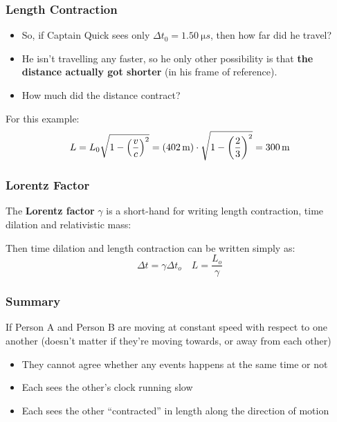 \documentclass[12pt,compress,aspectratio=169]{beamer}
\newcommand{\bigsqrt}{\ensuremath\sqrt{1-\left(\frac{v}{c}\right)^2}}
\newcommand{\lorentz}{\ensuremath\frac{1}{\bigsqrt}}
\begin{document}
\begin{frame}
  \frametitle{Length Contraction}
  \begin{itemize}
  \item So, if Captain Quick sees only $\Delta t_0=\SI{1.50}{\micro s}$, then
    how far did he travel?
  \item He isn't travelling any faster, so he only other possibility is that
    \textbf{the distance actually got shorter} (in his frame of reference).
  \item How much did the distance contract?
  \end{itemize}
  
  \vspace{-.3in}{\LARGE
    \begin{displaymath}
      \boxed{L=L_0\bigsqrt}
    \end{displaymath}
  }

  For this example:
  \begin{displaymath}
    L=L_0\bigsqrt=(\SI{402}{m})\cdot\sqrt{1-\left(\frac{2}{3}\right)^2}
    =\SI{300}{m}
  \end{displaymath}
\end{frame}

  
\begin{frame}
  \frametitle{Lorentz Factor}
  The \textbf{Lorentz factor} $\gamma$ is a short-hand for writing length
  contraction, time dilation and relativistic mass:

  \vspace{-.2in}{\LARGE
    \begin{displaymath}
      \boxed{\gamma=\lorentz}
    \end{displaymath}
  }
  Then time dilation and length contraction can be written simply as:
  {\LARGE
    \begin{displaymath}
      \boxed{\Delta t = \gamma \Delta t_o}\quad\boxed{L = \frac{L_o}{\gamma}}
    \end{displaymath}
  }
\end{frame}



\begin{frame}
  \frametitle{Summary}
  \begin{center}
  \end{center}
  If Person A and Person B are moving at constant speed with respect to one 
  another (doesn't matter if they're moving towards, or away from each other)
  \begin{itemize}
  \item They cannot agree whether any events happens at the same time or not
  \item Each sees the other's clock running slow
  \item Each sees the other ``contracted'' in length along the direction of
    motion
  \end{itemize}
\end{frame}
\end{document}
